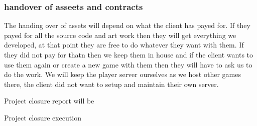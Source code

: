 \documentclass{article}
\begin{document}
\subsubsection{handover of asseets  and contracts}
The handing over of assets will depend on what the client has payed for.
If they payed for all the source code and art work then they will get everything we developed, at that point they are free to do whatever they want with them. If they did not pay for thatn then  we keep them in house and if the client wants to use them again or create a new game with them then they will have to ask us to do the work.
We will keep the player server ourselves as we host other games there, the client did not want to setup and maintain their own server.



Project closure report will be

Project closure execution 
\end{document}

